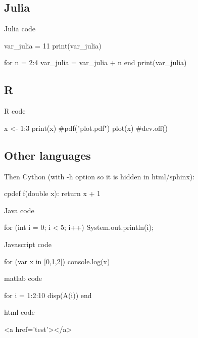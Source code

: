 \documentclass[%
oneside,                 %
final,                   %
chapterprefix=true,      %
open=right,              %
10pt]{book}
\begin{document}
\subsection{Julia}

Julia code




\bjl
var_julia = 11
print(var_julia)

\ejl

\bba
\eba






\bjl
for n = 2:4
  var_julia = var_julia + n
end
print(var_julia)

\ejl

\bba
\eba

\subsection{R }

R code







\br
x <- 1:3
print(x)
#pdf("plot.pdf")
plot(x)
#dev.off()

\er

\bba
\eba

\subsection{Other languages}

Then Cython (with -h option so it is hidden in html/sphinx):




\bcycod
cpdef f(double x):
    return x + 1

\ecycod


Java code




\bjava
for (int i = 0; i < 5; i++) {
  System.out.println(i);
}

\ejava


Javascript code


\bjs
for (var x in [0,1,2]) {console.log(x)}

\ejs


matlab code




\bdat
for i = 1:2:10
  disp(A(i))
end

\edat


html code


\bhtml
<a href='test'></a>
\end{document}
